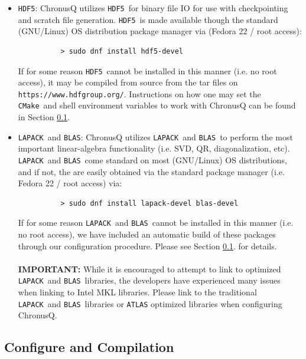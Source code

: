 \documentclass[12pt]{article}
\newcommand{\CMake}{\texttt{CMake}}
\newcommand{\HDF}{\texttt{HDF5}}
\newcommand{\LAPACK}{\texttt{LAPACK}}
\newcommand{\BLAS}{\texttt{BLAS}}
\newcommand{\Python}{\texttt{Python}}
\begin{document}
\begin{itemize}
	\begin{lstlisting}
          > sudo dnf install python-devel libxml2-devel libxslt-devel
	\end{lstlisting}
        To parse the input file, ChrounusQ relies on the \Python~module 
	\texttt{ConfigParser}. One may obtain \texttt{ConfigParser} through
	the \Python~\texttt{pip} module via:
	 
	\begin{lstlisting}
	  > pip install configparser
	\end{lstlisting}

      \item \HDF: ChronusQ utilizes \HDF~for binary file IO for use with 
        checkpointing and scratch file generation. \HDF~is made available
	though the standard (GNU/Linux) OS distribution package manager via
	(Fedora 22 / root access):

	\begin{lstlisting}
          > sudo dnf install hdf5-devel
	\end{lstlisting}
	If for some reason \HDF~cannot be installed in this manner (i.e. no
	root access), it may be compiled from source from the tar files on
	\texttt{https://www.hdfgroup.org/}. Instructions on how one may set
	the \CMake~and shell environment variables to work with ChronusQ
	can be found in Section \ref{subsec:ChronusQConfigCompile}.

      \item \LAPACK~and \BLAS: ChronusQ utilizes \LAPACK~and \BLAS~to perform
        the most important linear-algebra functionality (i.e. SVD, QR, 
	diagonalization, etc). \LAPACK~and \BLAS~come standard on most
	(GNU/Linux) OS distributions, and if not, the are easily obtained via
	the standard package manager (i.e. Fedora 22 / root access) via:

	\begin{lstlisting}
          > sudo dnf install lapack-devel blas-devel
	\end{lstlisting}
	If for some reason \LAPACK~and \BLAS~cannot be installed in this manner 
	(i.e. no root access), we have included an automatic build of these packages
	through our configuration procedure. Please see Section 
	\ref{subsec:ChronusQConfigCompile}. for details.\\
	\\
	\textbf{IMPORTANT:} While it is encouraged to attempt to link to optimized
	\LAPACK~and \BLAS~libraries, the developers have experienced many issues 
	when linking to Intel MKL libraries. Please link to the traditional
	\LAPACK~and \BLAS~libraries or \texttt{ATLAS} optimized libraries when
	configuring ChronusQ.

    \end{itemize}

    \subsection{Configure and Compilation} \label{subsec:ChronusQConfigCompile}
\end{document}
